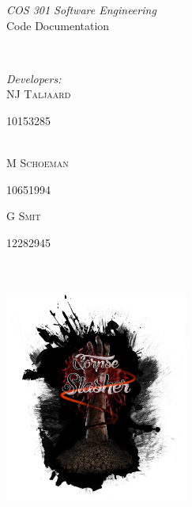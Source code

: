 \documentclass[letterpaper]{article}
\makeatletter
\def\printauthor{%
    {\large \@author}}
\makeatother
\begin{document}
\begin{titlepage}
\begin{center}
\begin{minipage}{0.4\textwidth}
\begin{flushleft} \large
\emph{COS 301 Software Engineering}\\
\vspace{1cm}
Code Documentation
\end{flushleft}
\end{minipage}
~
\begin{minipage}{0.4\textwidth}
	\begin{flushright} \large
	\emph{Developers:} \\
		NJ \textsc{Taljaard} \\
			\begin{small}
				10153285
			\end{small} \\
		M  \textsc{Schoeman} \\
			\begin{small}
				10651994 \\
			\end{small}
		G  \textsc{Smit} \\
			\begin{small}
				12282945
			\end{small}
	\end{flushright}
\end{minipage}\\



\includegraphics[width=60mm, height=80mm]{corpseslasher.png}\\ %
 
\end{center}
\vfill %

\end{titlepage}
\end{document}
